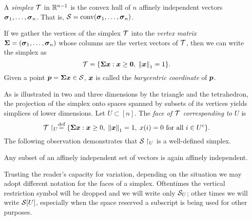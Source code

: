 \begin{definition}
\label{def:simplex}
A \emph{simplex} $\mathcal{T}$ in $\mathbb{R}^{n-1}$ is the convex hull of $n$ affinely independent vectors $\vb*{\sigma}_1,\dots,\vb*{\sigma}_n$. That is, $\mathcal{S}=\textnormal{conv}(\vb*{\sigma}_1,\dots,\vb*{\sigma}_n)$.  
\end{definition}

If we gather the vertices of the simplex $\mathcal{T}$ into the \emph{vertex matrix} $\boldsymbol{\Sigma}=(\vb*{\sigma}_1,\dots,\vb*{\sigma}_n)$ whose columns are the vertex vectors of $\mathcal{T}$, then we can write the simplex as 
\begin{equation*}
    \mathcal{T} = \{\boldsymbol{\Sigma} \vb*{x}:\vb*{x}\geq \vb{0}, \; \norm{\vb*{x}}_1=1\}.
\end{equation*}
Given a point $\vb*{p}=\boldsymbol{\Sigma}\vb*{x}\in\mathcal{S}$, $\vb*{x}$ is called the \emph{barycentric coordinate} of $\vb*{p}$.  

As is illustrated in two and three dimensions by the triangle and the tetrahedron, the projection of the simplex onto spaces spanned by subsets of its vertices yields simplices of lower dimensions. Let $U\subset [n]$. The \emph{face of $\mathcal{T}$ corresponding to $U$} is 
\begin{equation}
\label{eq:T_U}
    \mathcal{T}\restriction_U \overset{\text{def}}{=} \{\boldsymbol{\Sigma}\vb*{x}: \vb*{x}\geq 0,\;\norm{\vb*{x}}_1=1,\;x(i)=0\text{ for all }i\in U^c\}.
\end{equation}
The following observation demonstrates that $\mathcal{S}\restriction_U$ is a well-defined simplex. 
\begin{observation}
	\label{obs:subset_affinely_independent}
	Any subset of an affinely independent set of vectors is again affinely independent. 
\end{observation}

Trusting the reader's capacity for variation, depending on the situation we may adopt different notation for the faces of a simplex. Oftentimes the vertical restriction symbol will be dropped and we will write only $\mathcal{S}_U$; other times we will write $\mathcal{S}[U]$, especially when the space reserved a subscript is being used for other purposes. 

